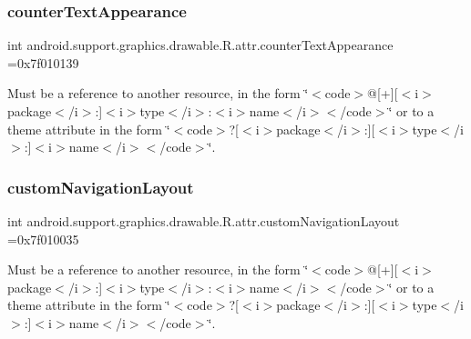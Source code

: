 \subsubsection{\texorpdfstring{counter\+Text\+Appearance}{counterTextAppearance}}
{\footnotesize\ttfamily int android.\+support.\+graphics.\+drawable.\+R.\+attr.\+counter\+Text\+Appearance =0x7f010139\hspace{0.3cm}{\ttfamily [static]}}

Must be a reference to another resource, in the form \char`\"{}$<$code$>$@\mbox{[}+\mbox{]}\mbox{[}$<$i$>$package$<$/i$>$\+:\mbox{]}$<$i$>$type$<$/i$>$\+:$<$i$>$name$<$/i$>$$<$/code$>$\char`\"{} or to a theme attribute in the form \char`\"{}$<$code$>$?\mbox{[}$<$i$>$package$<$/i$>$\+:\mbox{]}\mbox{[}$<$i$>$type$<$/i$>$\+:\mbox{]}$<$i$>$name$<$/i$>$$<$/code$>$\char`\"{}. \mbox{\label{classandroid_1_1support_1_1graphics_1_1drawable_1_1R_1_1attr_aeda3e6161d8cc3ba7878e10ae152297d}} 
\subsubsection{\texorpdfstring{custom\+Navigation\+Layout}{customNavigationLayout}}
{\footnotesize\ttfamily int android.\+support.\+graphics.\+drawable.\+R.\+attr.\+custom\+Navigation\+Layout =0x7f010035\hspace{0.3cm}{\ttfamily [static]}}

Must be a reference to another resource, in the form \char`\"{}$<$code$>$@\mbox{[}+\mbox{]}\mbox{[}$<$i$>$package$<$/i$>$\+:\mbox{]}$<$i$>$type$<$/i$>$\+:$<$i$>$name$<$/i$>$$<$/code$>$\char`\"{} or to a theme attribute in the form \char`\"{}$<$code$>$?\mbox{[}$<$i$>$package$<$/i$>$\+:\mbox{]}\mbox{[}$<$i$>$type$<$/i$>$\+:\mbox{]}$<$i$>$name$<$/i$>$$<$/code$>$\char`\"{}. \mbox{\label{classandroid_1_1support_1_1graphics_1_1drawable_1_1R_1_1attr_a0dc2f59682ad9f379c7ff355eea0a709}} 
